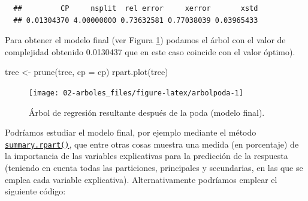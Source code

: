 \documentclass[
]{book}
\newenvironment{Shaded}{\begin{snugshade}}{\end{snugshade}}
\newcommand{\AttributeTok}[1]{\textcolor[rgb]{0.77,0.63,0.00}{#1}}
\newcommand{\CommentTok}[1]{\textcolor[rgb]{0.56,0.35,0.01}{\textit{#1}}}
\newcommand{\FunctionTok}[1]{\textcolor[rgb]{0.00,0.00,0.00}{#1}}
\newcommand{\NormalTok}[1]{#1}
\newcommand{\OtherTok}[1]{\textcolor[rgb]{0.56,0.35,0.01}{#1}}
\newcommand{\SpecialCharTok}[1]{\textcolor[rgb]{0.00,0.00,0.00}{#1}}
\newcommand{\StringTok}[1]{\textcolor[rgb]{0.31,0.60,0.02}{#1}}
\theoremstyle{break}
\theoremstyle{nonumberplain}
\renewcommand{\CommentTok}[1]{\textcolor[rgb]{0.41,0.41,0.41}{\texttt{#1}}}
\begin{document}
\begin{verbatim}
  ##         CP     nsplit  rel error     xerror       xstd 
  ## 0.01304370 4.00000000 0.73632581 0.77038039 0.03965433
\end{verbatim}

\begin{Shaded}
\end{Shaded}

Para obtener el modelo final (ver Figura \ref{fig:arbolpoda}) podamos el árbol con el valor de complejidad obtenido 0.0130437 que en este caso coincide con el valor óptimo).

\begin{Shaded}
\begin{Highlighting}[]
\NormalTok{tree }\OtherTok{\textless{}{-}} \FunctionTok{prune}\NormalTok{(tree, }\AttributeTok{cp =}\NormalTok{ cp)}
\FunctionTok{rpart.plot}\NormalTok{(tree) }
\end{Highlighting}
\end{Shaded}

\begin{figure}[!htb]

{\centering \texttt{[image: 02-arboles\_files/figure-latex/arbolpoda-1]} 

}

\caption{Árbol de regresión resultante después de la poda (modelo final).}\label{fig:arbolpoda}
\end{figure}

Podríamos estudiar el modelo final, por ejemplo mediante el método \href{https://rdrr.io/pkg/rpart/man/summary.rpart.html}{\texttt{summary.rpart()}}, que entre otras cosas muestra una medida (en porcentaje) de la importancia de las variables explicativas para la predicción de la respuesta (teniendo en cuenta todas las particiones, principales y secundarias, en las que se emplea cada variable explicativa).
Alternativamente podríamos emplear el siguiente código:
\end{document}
